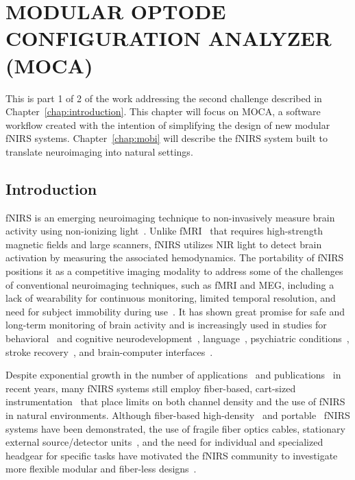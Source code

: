 
\chapter{MODULAR OPTODE CONFIGURATION ANALYZER (MOCA)} %
\label{chap:moca}
This is part 1 of 2 of the work addressing the second challenge described in Chapter~\ref{chap:introduction}. This chapter will focus on \ac{MOCA}, a software workflow created with the intention of simplifying the design of new modular \ac{fNIRS} systems. Chapter~\ref{chap:mobi} will describe the \ac{fNIRS} system built to translate neuroimaging into natural settings. 

\section{Introduction}
\label{sec:introduction}
\ac{fNIRS} is an emerging neuroimaging technique to non-invasively measure brain activity using non-ionizing light~\cite{Ferrari2012}. Unlike \ac{fMRI}~\cite{Heinzel2013} that requires high-strength magnetic fields and large scanners, \ac{fNIRS} utilizes \ac{NIR} light to detect brain activation by measuring the associated hemodynamics. The portability of \ac{fNIRS} positions it as a competitive imaging modality to address some of the challenges of conventional neuroimaging techniques, such as \ac{fMRI} and \ac{MEG}, including a lack of wearability for continuous monitoring, limited temporal resolution, and need for subject immobility during use~\cite{Yucel2017}. It has shown great promise for safe and long-term monitoring of brain activity and is increasingly used in studies for behavioral~\cite{McDonald2018} and cognitive neurodevelopment~\cite{Aslin2015, Vanderwert2014, Wilcox2015, Soltanlou2018}, language~\cite{Quaresima2012, Rossi2012}, psychiatric conditions~\cite{Ehlis2014, Kumar2017}, stroke recovery~\cite{Yang2019}, and brain-computer interfaces~\cite{Naseer2015, Ahn2017, Hong2018}. 

Despite exponential growth in the number of applications~\cite{Boas2014, Quaresima2019} and publications~\cite{Yucel2017} in recent years, many \ac{fNIRS} systems still employ fiber-based, cart-sized instrumentation~\cite{Scholkmann2014} that place limits on both channel density and the use of \ac{fNIRS} in natural environments. Although fiber-based high-density~\cite{Eggebrecht2014} and portable~\cite{Wheelock2019} \ac{fNIRS} systems have been demonstrated, the use of fragile fiber optics cables, stationary external source/detector units~\cite{Oxymon2017, Techen2018}, and the need for individual and specialized headgear for specific tasks have motivated the \ac{fNIRS} community to investigate more flexible modular and fiber-less designs~\cite{Zhao2017, Curtin2018}.


